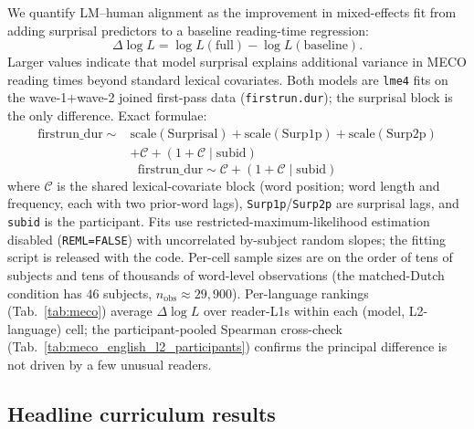 We quantify LM--human alignment as the improvement in mixed-effects fit from adding surprisal predictors to a baseline reading-time regression:
\[
\Delta\log L = \log L(\text{full}) - \log L(\text{baseline}).
\]
Larger values indicate that model surprisal explains additional variance in MECO reading times beyond standard lexical covariates. Both models are \texttt{lme4} fits on the wave-1$+$wave-2 joined first-pass data (\texttt{firstrun.dur}); the surprisal block is the only difference. Exact formulae:
\begin{equation}
\label{eq:full-model}
\begin{split}
\mathrm{firstrun\_dur} \sim{}&
\mathrm{scale}(\mathrm{Surprisal})
+ \mathrm{scale}(\mathrm{Surp1p})
+ \mathrm{scale}(\mathrm{Surp2p}) \\
&+ \mathcal{C}
+ (1 + \mathcal{C} \mid \mathrm{subid})
\end{split}
\end{equation}
\begin{equation}
\label{eq:meco-spec}
\mathrm{firstrun\_dur} \sim
\mathcal{C}
+ (1 + \mathcal{C} \mid \mathrm{subid})
\end{equation}
where $\mathcal{C}$ is the shared lexical-covariate block (word position; word length and frequency, each with two prior-word lags), \texttt{Surp1p}/\texttt{Surp2p} are surprisal lags, and \texttt{subid} is the participant. Fits use restricted-maximum-likelihood estimation disabled (\texttt{REML=FALSE}) with uncorrelated by-subject random slopes; the fitting script is released with the code. Per-cell sample sizes are on the order of tens of subjects and tens of thousands of word-level observations (the matched-Dutch condition has $46$ subjects, $n_{\text{obs}}{\approx}29{,}900$). Per-language rankings (Tab.~\ref{tab:meco}) average $\Delta\log L$ over reader-L1s within each (model, L2-language) cell; the participant-pooled Spearman cross-check (Tab.~\ref{tab:meco_english_l2_participants}) confirms the principal difference is not driven by a few unusual readers.
 
\subsection{Headline curriculum results}\label{sec:meco-headline-app}
 
